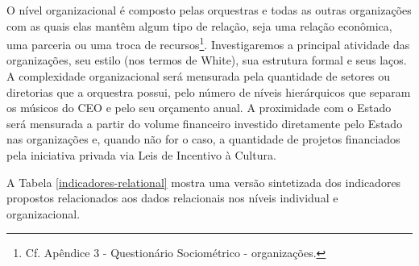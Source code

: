 \documentclass[a4paper, 12pt, openright, oneside, german, french, english, brazil]{abntex2}
\begin{document}
	O nível organizacional é composto pelas orquestras e todas as outras organizações com as quais elas mantêm algum tipo de relação, seja uma relação econômica, uma parceria ou uma troca de recursos\footnote{Cf. Apêndice 3 - Questionário Sociométrico - organizações.}. Investigaremos a principal atividade das organizações, seu estilo (nos termos de White), sua estrutura formal e seus laços. 
	A complexidade organizacional será mensurada pela quantidade de setores ou diretorias que a orquestra possui, pelo número de níveis hierárquicos que separam os músicos do CEO e pelo seu orçamento anual. A proximidade com o Estado será mensurada a partir do volume financeiro investido diretamente pelo Estado nas organizações e, quando não for o caso, a quantidade de projetos financiados pela iniciativa privada via Leis de Incentivo à Cultura.
	
	
	
	A Tabela \ref{indicadores-relational} mostra uma versão sintetizada dos indicadores propostos relacionados aos dados relacionais nos níveis individual e organizacional.
	
	
\end{document}
